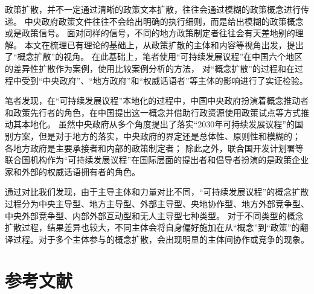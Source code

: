 \documentclass[
  12pt,
]{ctexart}
\begin{document}
政策扩散，并不一定通过清晰的政策文本扩散，往往会通过模糊的政策概念进行传递。
中央政府政策文件往往不会给出明确的执行细则，而是给出模糊的政策概念或是政策信号。
面对同样的信号，不同的地方政策制定者往往会有天差地别的理解。
本文在梳理已有理论的基础上，从政策扩散的主体和内容等视角出发，提出了``概念扩散''的视角。
在此基础上，笔者使用``可持续发展议程''在中国六个地区的差异性扩散作为案例，使用比较案例分析的方法，
对``概念扩散''的过程和在过程中受到``中央政府''、``地方政府''和``权威话语者''等主体的影响进行了实证检验。

笔者发现，在``可持续发展议程''本地化的过程中，中国中央政府扮演着概念推动者和政策先行者的角色，在中国提出这一概念并借助行政资源使用政策试点等方式推动其本地化。
虽然中央政府从多个角度提出了落实``2030年可持续发展议程''的国别方案，但是对于地方的落实，中央政府的界定还是总体性、原则性和模糊的；
各地方政府是主要承接者和内部的政策制定者；
除此之外，联合国开发计划署等联合国机构作为``可持续发展议程''在国际层面的提出者和倡导者扮演的是政策企业家和外部的权威话语拥有者的角色。

通过对比我们发现，由于主导主体和力量对比不同，``可持续发展议程''的概念扩散过程分为中央主导型、地方主导型、外部主导型、央地协作型、地方外部竞争型、中央外部竞争型、内部外部互动型和无人主导型七种类型。
对于不同类型的概念扩散过程，结果差异也较大，不同主体会将自身偏好施加在从``概念''到``政策''的翻译过程。对于多个主体参与的概念扩散，会出现明显的主体间协作或竞争的现象。

\newpage

\hypertarget{ux53c2ux8003ux6587ux732e}{%
\section*{参考文献}\label{ux53c2ux8003ux6587ux732e}}
\end{document}
